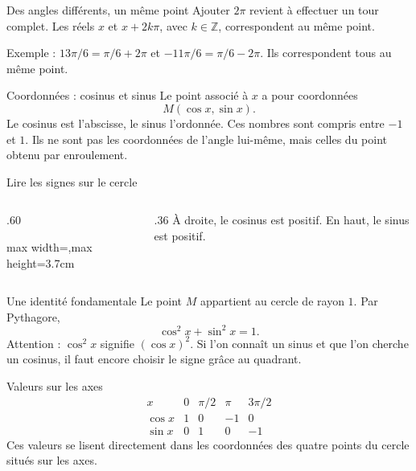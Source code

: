 \documentclass[aspectratio=169,12pt]{beamer}
\begin{document}
\renewcommand{\slidekind}{COMPRENDRE}
\begin{frame}[t,fragile]{Des angles différents, un même point}
Ajouter $2\pi$ revient à effectuer un tour complet. Les réels $x$ et $x+2k\pi$, avec $k\in\mathbb Z$, correspondent au même point.\medskip\par Exemple : $13\pi/6=\pi/6+2\pi$ et $-11\pi/6=\pi/6-2\pi$. Ils correspondent tous au même point.
\end{frame}
\renewcommand{\slidekind}{COMPRENDRE}
\begin{frame}[t,fragile]{Coordonnées : cosinus et sinus}
Le point associé à $x$ a pour coordonnées\[M(\cos x,\sin x).\] Le cosinus est l’abscisse, le sinus l’ordonnée. Ces nombres sont compris entre $-1$ et $1$. Ils ne sont pas les coordonnées de l’angle lui-même, mais celles du point obtenu par enroulement.
\end{frame}
\renewcommand{\slidekind}{COMPRENDRE}
\begin{frame}[t,fragile]{Lire les signes sur le cercle}
\begin{columns}[c,onlytextwidth]\begin{column}{.60\textwidth}\centering\begin{adjustbox}{max width=\linewidth,max height=3.7cm}\end{adjustbox}\end{column}\begin{column}{.36\textwidth} À droite, le cosinus est positif. En haut, le sinus est positif.\end{column}\end{columns}
\end{frame}
\renewcommand{\slidekind}{COMPRENDRE}
\begin{frame}[t,fragile]{Une identité fondamentale}
Le point $M$ appartient au cercle de rayon $1$. Par Pythagore,\[\cos^2x+\sin^2x=1.\] Attention : $\cos^2x$ signifie $(\cos x)^2$. Si l’on connaît un sinus et que l’on cherche un cosinus, il faut encore choisir le signe grâce au quadrant.
\end{frame}
\renewcommand{\slidekind}{COMPRENDRE}
\begin{frame}[t,fragile]{Valeurs sur les axes}
\[\begin{array}{c|rrrr}x&0&\pi/2&\pi&3\pi/2\\\hline\cos x&1&0&-1&0\\\sin x&0&1&0&-1\end{array}\]\medskip Ces valeurs se lisent directement dans les coordonnées des quatre points du cercle situés sur les axes.
\end{frame}
\end{document}
